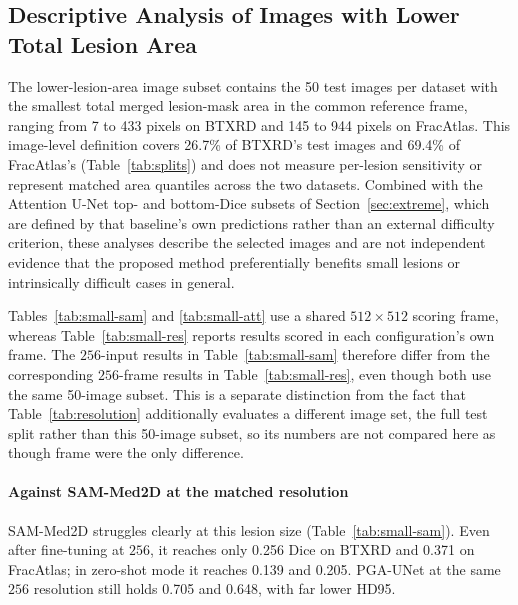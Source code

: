 \subsection{Descriptive Analysis of Images with Lower Total Lesion Area}
\label{sec:small}
The lower-lesion-area image subset contains the 50 test images per dataset with the smallest total merged lesion-mask area in the common reference frame, ranging from 7 to 433 pixels on BTXRD and 145 to 944 pixels on FracAtlas. This image-level definition covers 26.7\% of BTXRD's test images and 69.4\% of FracAtlas's (Table~\ref{tab:splits}) and does not measure per-lesion sensitivity or represent matched area quantiles across the two datasets. Combined with the Attention U-Net top- and bottom-Dice subsets of Section~\ref{sec:extreme}, which are defined by that baseline's own predictions rather than an external difficulty criterion, these analyses describe the selected images and are not independent evidence that the proposed method preferentially benefits small lesions or intrinsically difficult cases in general.

Tables~\ref{tab:small-sam} and \ref{tab:small-att} use a shared $512\times512$ scoring frame, whereas Table~\ref{tab:small-res} reports results scored in each configuration's own frame. The $256$-input results in Table~\ref{tab:small-sam} therefore differ from the corresponding $256$-frame results in Table~\ref{tab:small-res}, even though both use the same 50-image subset. This is a separate distinction from the fact that Table~\ref{tab:resolution} additionally evaluates a different image set, the full test split rather than this 50-image subset, so its numbers are not compared here as though frame were the only difference.

\paragraph{Against SAM-Med2D at the matched resolution}
SAM-Med2D struggles clearly at this lesion size (Table~\ref{tab:small-sam}). Even after fine-tuning at $256$, it reaches only 0.256 Dice on BTXRD and 0.371 on FracAtlas; in zero-shot mode it reaches 0.139 and 0.205. PGA-UNet at the same $256$ resolution still holds 0.705 and 0.648, with far lower HD95.


